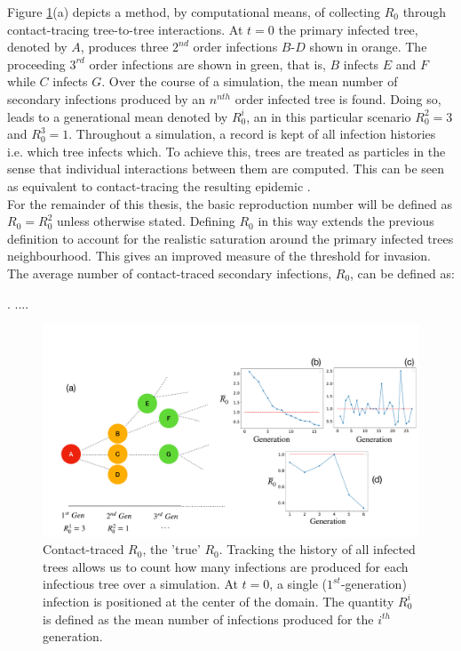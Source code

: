 Figure \ref{fig:contact-trace}(a) depicts a method, by computational means, of collecting $R_0$ %
through contact-tracing tree-to-tree interactions. %
At $t=0$ the primary infected tree, denoted by $A$, produces three $2^{nd}$ order infections %
$B$-$D$ shown in orange. %
The proceeding $3^{rd}$ order infections are shown in green, that is, $B$ infects $E$ and $F$ while $C$ infects $G$. %
Over the course of a simulation, the mean number of secondary infections produced by an $n^{nth}$ order infected tree is found. %
Doing so, leads to a generational mean denoted by $R^i_0$, an in this particular scenario $R^2_0=3$ and $R^3_0=1$. 
Throughout a simulation, a record is kept of all infection histories i.e. which tree infects which. 
To achieve this, trees are treated as particles in the sense that individual interactions between them are computed. 
This can be seen as equivalent to contact-tracing the resulting epidemic \cite{eames2003contact}. \\

For the remainder of this thesis, the basic reproduction number will be defined as $R_0=R^2_0$ unless otherwise stated. 
Defining $R_0$ in this way extends the previous definition to account for the realistic %
saturation around the primary infected trees neighbourhood. This gives an improved measure %
of the threshold for invasion. The average number of contact-traced secondary infections, $R_0$, can be defined as:
\begin{defn}. %
....
\label{def:R0_contact_traced}
\end{defn}

\begin{figure}
    \centering
    \includegraphics[scale=0.255]{chapter5/figures/fig1.pdf}
    \caption{Contact-traced $R_0$, the 'true' $R_0$. Tracking the history of all infected trees allows us to count how many infections are produced for each infectious tree over a simulation. At $t=0$, a single ($1^{st}$-generation) infection is positioned at the center of the domain. The quantity $R^i_0$ is defined as the mean number of infections produced for  the $i^{th}$ generation.}
    \label{fig:contact-trace}
\end{figure}

